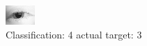 \begin{figure}[h!]
\begin{center}
\includegraphics[width=0.60\columnwidth]{figures/ID6_class_4_target_3.png}
\end{center}
\caption{ Classification: 4 actual target: 3}
\label{fig:ID6_class_4_target_3}
\end{figure}

